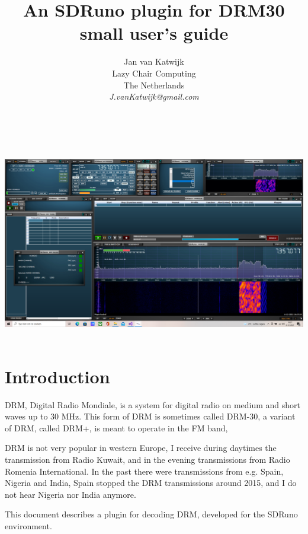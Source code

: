 \documentclass[10pt]{article}
\begin{document}
\title{An SDRuno plugin for DRM30\\
{small user's guide}}
\author{
Jan van Katwijk\\
Lazy Chair Computing \\
The Netherlands\\
{\em J.vanKatwijk@gmail.com}}
\maketitle
\ \\
\ \\
\includegraphics[width=160mm]{drm-decoder.png}
\ \\
\section{Introduction}
DRM, Digital Radio Mondiale, is a system for digital radio on medium and
short waves up to 30 MHz. This form of DRM is sometimes called DRM-30, a variant
of DRM, called DRM+, is meant to operate in the FM band,
\par 
DRM is not very popular in western Europe, I receive during daytimes the
transmission from Radio Kuwait, and in the evening transmissions from
Radio Romenia International.
In the past there were transmissions from e.g. Spain, Nigeria and India,
Spain stopped the DRM transmissions around 2015, and
I do not hear Nigeria nor India anymore.

This document describes a plugin for decoding DRM,
developed for the SDRuno environment.
\end{document}
